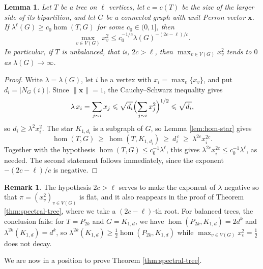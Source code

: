 \documentclass[11pt, a4paper]{article}
\newtheorem{lemma}[theorem]{Lemma}
\theoremstyle{definition}
\newtheorem{remark}{Remark}
\theoremstyle{plain}
\renewcommand{\le}{\leqslant}
\renewcommand{\ge}{\geqslant}
\begin{document}
\begin{lemma}
\label{lem:flat-tree}
Let $T$ be a tree on $\ell$ vertices, let
$c=c(T)$ be the size of the larger side of its
bipartition, and 
let $G$ be a connected graph with unit Perron vector $\bm{x}$. If
$\lambda^{\ell}(G)\ge c_0\hom (T,G)$ for some 
$c_0\in (0,1]$, then 
\begin{equation*}
  \max_{v\in V(G)}x_v^2  \le c_0^{-1/c}
    \lambda (G)^{-(2c-\ell )/c}. 
\end{equation*}
In particular, if $T$ is unbalanced, that is, 
$2c>\ell$, then $\max_{v\in V(G)} x_v^2$ tends to $0$ as $\lambda (G)\to \infty$.
\end{lemma}

\begin{proof}
Write $\lambda =\lambda (G)$, let $i$ be a vertex
with $x_i=\max_{v} \{x_v\}$, and put $d_i=|N_G(i)|$. Since
$\lVert \bm{x}\rVert =1$, the Cauchy--Schwarz
inequality gives
\[
  \lambda \, x_i =\sum_{j\sim i}x_j
  \le \sqrt{d_i}\Bigl(\sum_{j\sim i}x_j^2\Bigr)^{1/2}
  \le \sqrt{d_i},
\]
so $d_i\ge \lambda^2 x_i^2$. The star $K_{1,d_i}$ is a subgraph of $G$, so
Lemma \ref{lem:hom-star} gives
\[
  \hom (T,G)\ \ge\ \hom (T,K_{1,d_i})
  \ \ge\ d_i^{\,c}\ \ge\ \lambda^{2c} x_i^{2c}.
\]
Together with the hypothesis $\hom (T,G)\le 
c_0^{-1}\lambda^{\ell}$, 
this gives $\lambda^{2c}x_i^{2c} \le c_0^{-1} \lambda^{ \ell}$, as needed. The second
statement follows immediately, since the
exponent $-(2c-\ell )/c$ is negative.
\end{proof}

\begin{remark}
The hypothesis $2c>\ell$ serves to make the exponent of $\lambda$ negative so that $\pi=(x_v^2)_{v\in V(G)}$ is flat, and it also reappears in the proof of Theorem \ref{thm:spectral-tree}, where we take a $(2c - \ell)$-th root. For balanced trees, the
conclusion fails: for $T=P_{2k}$ and  $G=K_{1,d}$, 
we have $\hom (P_{2k},K_{1,d})=2d^{k}$ and
$\lambda^{2k}(K_{1,d})=d^{k}$, so
$\lambda^{2k} (K_{1,d}) \ge \frac12\hom (P_{2k},K_{1,d})$
while $\max_{v\in V(G)} x_v^2=\frac12$ does not decay.
\end{remark}

We are now in a position to prove Theorem \ref{thm:spectral-tree}. 
\end{document}
